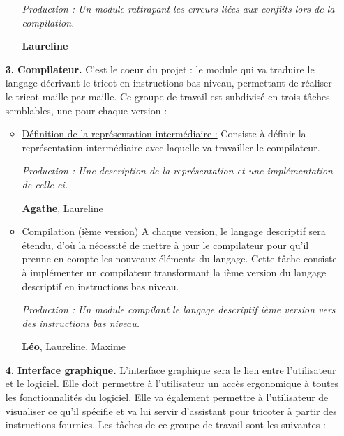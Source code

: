 \documentclass{article}
\begin{document}
\begin{itemize}
\begin{itemize}
      \textit{Production : Un module rattrapant les erreurs liées aux conflits lors de la compilation.}

      \textbf{Laureline}

    \end{itemize}

\medskip

\item[\textbf{3.}] \textbf{Compilateur.} C'est le coeur du projet : le module qui va traduire le langage décrivant le tricot en instructions
bas niveau, permettant de réaliser le tricot maille par maille. Ce groupe de travail est subdivisé en trois tâches semblables, une pour
chaque version :

    \begin{itemize}
    \item \underline{Définition de la représentation intermédiaire :} Consiste à définir la représentation intermédiaire avec laquelle va travailler le compilateur.

      \textit{Production : Une description de la représentation et une implémentation de celle-ci.}

      \textbf{Agathe}, Laureline

    \item \underline{Compilation (ième version)} A chaque version, le langage descriptif sera étendu, d'où la nécessité de mettre à jour le
compilateur pour qu'il prenne en compte les nouveaux éléments du langage. Cette tâche consiste à implémenter un compilateur transformant
la ième version du langage descriptif en instructions bas niveau.

      \textit{Production : Un module compilant le langage descriptif ième version vers des instructions bas niveau.}

      \textbf{Léo}, Laureline, Maxime %
    \end{itemize}

\medskip

\item[\textbf{4.}] \textbf{Interface graphique.} L'interface graphique sera le lien entre l'utilisateur et le logiciel. Elle doit permettre à
l'utilisateur un accès ergonomique à toutes les fonctionnalités du logiciel. Elle va également permettre à l'utilisateur de visualiser ce
qu'il spécifie et va lui servir d'assistant pour tricoter à partir des instructions fournies. Les tâches de ce groupe de travail sont les
suivantes :


\end{itemize}
\end{document}
